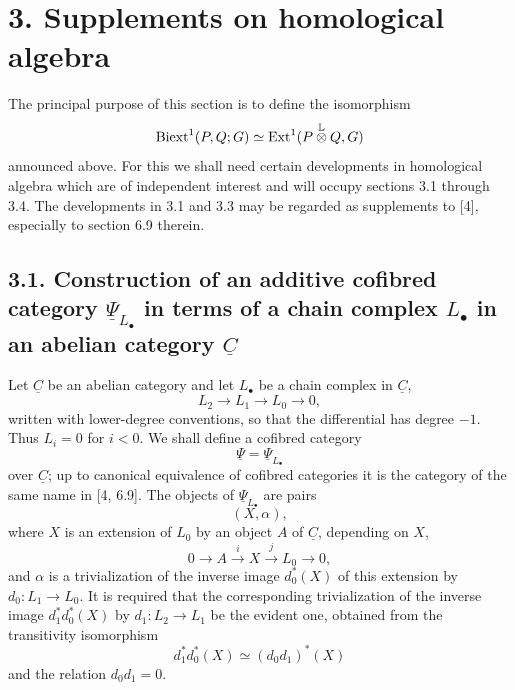 
\section*{3. Supplements on homological algebra}

The principal purpose of this section is to define the isomorphism
\[
 \operatorname{Biext}^1(P,Q;G)\simeq
 \operatorname{Ext}^1(P\overset{\mathbb L}{\otimes}Q,G)
\]
announced above. For this we shall need certain developments in
homological algebra which are of independent interest and will occupy
sections 3.1 through 3.4. The developments in 3.1 and 3.3 may be
regarded as supplements to [4], especially to section 6.9 therein.

\subsection*{3.1. Construction of an additive cofibred category
$\underline\Psi_{L_\bullet}$ in terms of a chain complex $L_\bullet$
in an abelian category $\underline C$}

Let $\underline C$ be an abelian category and let $L_\bullet$ be a
chain complex in $\underline C$,
\begin{equation}\tag{3.1.1}
 L_2\longrightarrow L_1\longrightarrow L_0\longrightarrow0,
\end{equation}
written with lower-degree conventions, so that the differential has
degree $-1$. Thus $L_i=0$ for $i<0$. We shall define a cofibred
category
\[
 \underline\Psi=\underline\Psi_{L_\bullet}
\]
over $\underline C$; up to canonical equivalence of cofibred
categories it is the category of the same name in [4, 6.9]. The
objects of $\underline\Psi_{L_\bullet}$ are pairs
\[
 (X,\alpha),
\]
where $X$ is an extension of $L_0$ by an object $A$ of
$\underline C$, depending on $X$,
\begin{equation}\tag{3.1.2}
 0\longrightarrow A\xrightarrow{i}X\xrightarrow{j}L_0
 \longrightarrow0,
\end{equation}
and $\alpha$ is a trivialization of the inverse image $d_0^*(X)$ of
this extension by $d_0:L_1\longrightarrow L_0$. It is required that
the corresponding trivialization of the inverse image
$d_1^*d_0^*(X)$ by $d_1:L_2\longrightarrow L_1$ be the evident one,
obtained from the transitivity isomorphism
\[
 d_1^*d_0^*(X)\simeq(d_0d_1)^*(X)
\]
and the relation $d_0d_1=0$.


